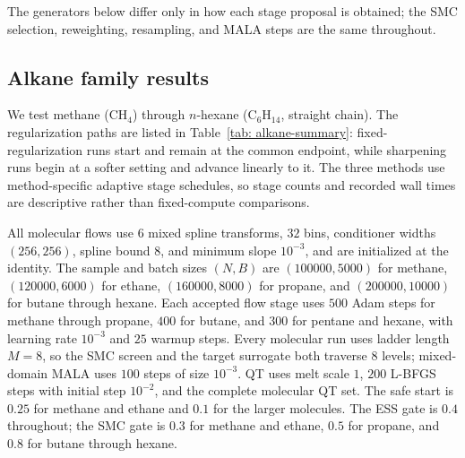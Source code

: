 \documentclass{article}
\begin{document}
The generators below differ only in how each stage proposal is obtained; the SMC selection, reweighting, resampling, and MALA steps are the same throughout.

\subsection{Alkane family results}
\label{sec: alkane-results}

We test methane (\(\mathrm{CH_4}\)) through \(n\)-hexane (\(\mathrm{C_6H_{14}}\), straight chain). The regularization paths are listed in Table~\ref{tab: alkane-summary}: fixed-regularization runs start and remain at the common endpoint, while sharpening runs begin at a softer setting and advance linearly to it. The three methods use method-specific adaptive stage schedules, so stage counts and recorded wall times are descriptive rather than fixed-compute comparisons.

All molecular flows use $6$ mixed spline transforms, $32$ bins, conditioner widths $(256,256)$, spline bound $8$, and minimum slope $10^{-3}$, and are initialized at the identity. The sample and batch sizes $(N,B)$ are $(100000,5000)$ for methane, $(120000,6000)$ for ethane, $(160000,8000)$ for propane, and $(200000,10000)$ for butane through hexane. Each accepted flow stage uses $500$ Adam steps for methane through propane, $400$ for butane, and $300$ for pentane and hexane, with learning rate $10^{-3}$ and $25$ warmup steps. Every molecular run uses ladder length $M=8$, so the SMC screen and the target surrogate both traverse $8$ levels; mixed-domain MALA uses $100$ steps of size $10^{-3}$. QT uses melt scale $1$, $200$ L-BFGS steps with initial step $10^{-2}$, and the complete molecular QT set. The safe start is $0.25$ for methane and ethane and $0.1$ for the larger molecules. The ESS gate is $0.4$ throughout; the SMC gate is $0.3$ for methane and ethane, $0.5$ for propane, and $0.8$ for butane through hexane.
\end{document}
